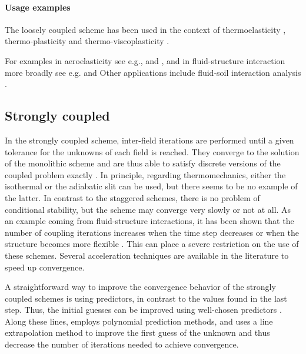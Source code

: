 \paragraph{Usage examples}

The loosely coupled scheme has been used in the context of thermoelasticity \citep{argyris_natural_1981, armero_new_1992, johansson_thermoelastic_1993, miehe_entropic_1995, miehe_theory_1995, holzapfel_entropy_1996}, thermo-plasticity \citep{armero_new_1992, armero_priori_1993, simo_associative_1992, wriggers_coupled_1992, agelet_de_saracibar_numerical_1998, agelet_de_saracibar_formulation_1999} and thermo-viscoplasticity \citep{adam_numerical_2002, adam_numerical_2002-1}.

For examples in aeroelasticity see e.g., \cite{piperno_partitioned_1995, farhat_two_2000} and \cite{farhat_application_2003}, and in fluid-structure interaction more broadly see e.g. \cite{tezduyar2006space} and \cite{miller_loosely_2015}
Other applications include fluid-soil interaction analysis \citep{saetta_unconditionally_1992, armero_formulation_1999, mikelic_convergence_2013}.


\subsection{Strongly coupled}

In the strongly coupled scheme, inter-field iterations are performed until a given tolerance for the unknowns of each field is reached.
They converge to the solution of the monolithic scheme and are thus able to satisfy discrete versions of the coupled problem exactly \citep{forster_robust_2007, danowski_computational_2014}.
In principle, regarding thermomechanics, either the isothermal or the adiabatic slit can be used, but there seems to be no example of the latter.
In contrast to the staggered schemes, there is no problem of conditional stability, but the scheme may converge very slowly or not at all.
As an example coming from fluid-structure interactions, it has been shown that the number of coupling iterations increases when the time step decreases or when the structure becomes more flexible \citep{degroote_stability_2008}.
This can place a severe restriction on the use of these schemes.
Several acceleration techniques are available in the literature to speed up convergence.

A straightforward way to improve the convergence behavior of the strongly coupled schemes is using predictors, in contrast to the values found in the last step.
Thus, the initial guesses can be improved using well-chosen predictors \cite{michler_efficient_2005}.
Along these lines, \cite{erbts_accelerated_2012} employs polynomial prediction methods, and \cite{wendt_partitioned_2015} uses a line extrapolation method to improve the first guess of the unknown and thus decrease the number of iterations needed to achieve convergence.

